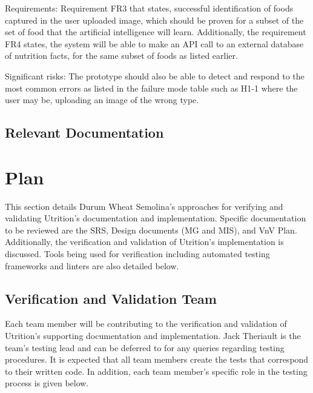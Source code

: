 \documentclass[12pt, titlepage]{article}
\begin{document}
		Requirements: Requirement FR3 that states, successful identification of foods captured in the user uploaded image, which should be proven for a subset of the set of food that the artificial intelligence will learn. Additionally, the requirement FR4 states, the system will be able to make an API call to an external database of nutrition facts, for the same subset of foods as listed earlier.  

		Significant risks: The prototype should also be able to detect and respond to the most common errors as listed in the failure mode table such as H1-1 where the user may be, uploading an image of the wrong type.  
	
	\subsection{Relevant Documentation}
	
	
	\citet{SRS}
	
	
	\section{Plan}
	
	This section details Durum Wheat Semolina's approaches for verifying and validating Utrition's documentation and implementation. Specific documentation to be reviewed are the SRS, Design documents (MG and MIS), and VnV Plan. Additionally, the verification and validation of Utrition's implementation is discussed. Tools being used for verification including automated testing frameworks and linters are also detailed below.
	
	\subsection{Verification and Validation Team}
	
	
	Each team member will be contributing to the verification and validation of Utrition's supporting documentation and implementation. Jack Theriault is the team's testing lead and can be deferred to for any queries regarding testing procedures. It is expected that all team members create the tests that correspond to their written code. In addition, each team member's specific role in the testing process is given below.
	
\end{document}
